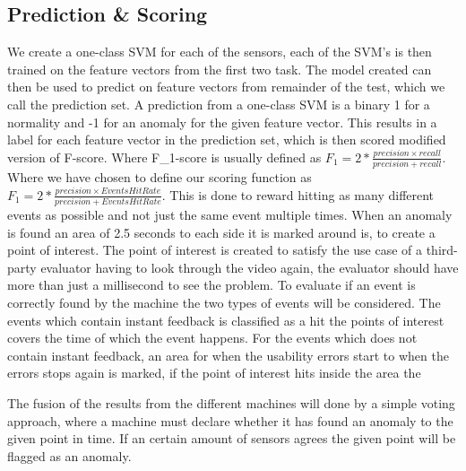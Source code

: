 \subsection{Prediction \& Scoring}
We create a one-class SVM for each of the sensors, each of the SVM's is then trained on the feature vectors from the first two task. The model created can then be used to predict on feature vectors from remainder of the test, which we call the prediction set.
A prediction from a one-class SVM is a binary 1 for a normality and -1 for an anomaly for the given feature vector.
This results in a label for each feature vector in the prediction set, which is then scored modified version of F-score.
Where F_1-score is usually defined as $F_1 = 2 * \frac{precision \times recall}{precision + recall}$. Where we have chosen to define our scoring function as $F_1 = 2 * \frac{precision \times EventsHitRate}{precision + EventsHitRate}$. This is done to reward hitting as many different events as possible and not just the same event multiple times.
When an anomaly is found an area of 2.5 seconds to each side it is marked around is, to create a point of interest. The point of interest is created to satisfy the use case of a third-party evaluator having to look through the video again, the evaluator should have more than just a millisecond to see the problem. 
To evaluate if an event is correctly found by the machine the two types of events will be considered.
The events which contain instant feedback is classified as a hit the points of interest covers the time of which the event happens.
For the events which does not contain instant feedback, an area for when the usability errors start to when the errors stops again is marked, if the point of interest hits inside the area the 

The fusion of the results from the different machines will done by a simple voting approach, where a machine must declare whether it has found an anomaly to the given point in time. If an certain amount of sensors agrees the given point will be flagged as an anomaly. 




